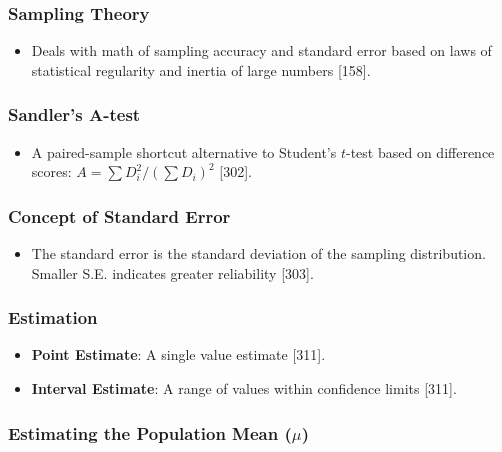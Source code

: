 \documentclass[
]{article}
\providecommand{\tightlist}{%
  \setlength{\itemsep}{0pt}\setlength{\parskip}{0pt}}
\begin{document}
\subsubsection{Sampling Theory}\label{sampling-theory}

\begin{itemize}
\tightlist
\item
  Deals with math of sampling accuracy and standard error based on laws
  of statistical regularity and inertia of large numbers {[}158{]}.
\end{itemize}

\subsubsection{Sandler's A-test}\label{sandlers-a-test}

\begin{itemize}
\tightlist
\item
  A paired-sample shortcut alternative to Student's \(t\)-test based on
  difference scores: \(A = \sum D_i^2 / (\sum D_i)^2\) {[}302{]}.
\end{itemize}

\subsubsection{Concept of Standard
Error}\label{concept-of-standard-error}

\begin{itemize}
\tightlist
\item
  The standard error is the standard deviation of the sampling
  distribution. Smaller S.E. indicates greater reliability {[}303{]}.
\end{itemize}

\subsubsection{Estimation}\label{estimation}

\begin{itemize}
\tightlist
\item
  \textbf{Point Estimate}: A single value estimate {[}311{]}.
\item
  \textbf{Interval Estimate}: A range of values within confidence limits
  {[}311{]}.
\end{itemize}

\subsubsection{\texorpdfstring{Estimating the Population Mean
(\(\mu\))}{Estimating the Population Mean (\textbackslash mu)}}\label{estimating-the-population-mean-mu}
\end{document}
